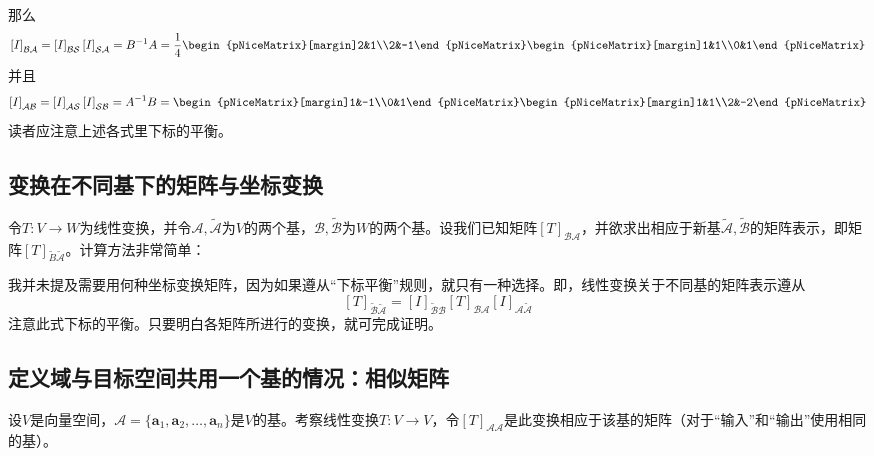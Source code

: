 那么\[\left[I\right]_{\mathcal{BA}}=\left[I\right]_{\mathcal{BS}}\left[I\right]_{\mathcal{SA}}=B^{-1}A=\frac{1}{4}\begin{pNiceMatrix}[margin]2&1\\2&-1\end{pNiceMatrix}\begin{pNiceMatrix}[margin]1&1\\0&1\end{pNiceMatrix}\]
并且\[\left[I\right]_{\mathcal{AB}}=\left[I\right]_{\mathcal{AS}}\left[I\right]_{\mathcal{SB}}=A^{-1}B=\begin{pNiceMatrix}[margin]1&-1\\0&1\end{pNiceMatrix}\begin{pNiceMatrix}[margin]1&1\\2&-2\end{pNiceMatrix}\]
读者应注意上述各式里下标的平衡。

\subsection{变换在不同基下的矩阵与坐标变换}\label{sec:matrix_in_different_basis}

令$T:V\to W$为线性变换，并令$\mathcal{A},\widetilde{\mathcal{A}}$为$V$的两个基，$\mathcal{B},\widetilde{\mathcal{B}}$为$W$的两个基。设我们已知矩阵$[T]_\mathcal{BA}$，并欲求出相应于新基$\widetilde{\mathcal{A}},\widetilde{\mathcal{B}}$的矩阵表示，即矩阵$[T]_{\widetilde{B}\widetilde{\mathcal{A}}}$。计算方法非常简单：
\begin{center}
\end{center}
我并未提及需要用何种坐标变换矩阵，因为如果遵从“下标平衡”规则，就只有一种选择。即，线性变换关于不同基的矩阵表示遵从
\[\boxed{[T]_{\widetilde{\mathcal{B}}\widetilde{\mathcal{A}}}=[I]_{\widetilde{\mathcal{B}}\mathcal{B}}[T]_{\mathcal{B}\mathcal{A}}[I]_{\mathcal{A}\widetilde{\mathcal{A}}}}\]
注意此式下标的平衡。只要明白各矩阵所进行的变换，就可完成证明。

\subsection{定义域与目标空间共用一个基的情况：相似矩阵}

设$V$是向量空间，$\mathcal{A}=\{\mathbf{a}_{1},\mathbf{a}_{2},\ldots,\mathbf{a}_{n}\}$是$V$的基。考察线性变换$T:V\to V$，令$[T]_{\mathcal{AA}}$是此变换相应于该基的矩阵（对于“输入”和“输出”使用相同的基）。

